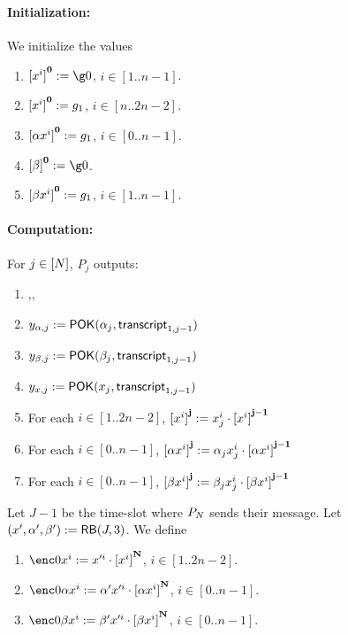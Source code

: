 \documentclass{article}
\begin{document}
\paragraph{Initialization:}
We initialize the values
\begin{enumerate}
 \item $\acc{x^i}{0}\defeq \g0$, $i\in [1..n-1]$. 
 \item ${{[x^i]}^{\mathbf{0}}}:= g_1$, $i\in [n..2n-2]$. 
 \item ${{[\alpha x^i]}^{\mathbf{0}}}:= g_1$, $i\in [0..n-1]$.
 \item $\acc{\beta}{0}\defeq \g0$.
 \item ${{[\beta x^i]}^{\mathbf{0}}}:= g_1$, $i\in [1..n-1]$.
\end{enumerate}


\paragraph{Computation:}
For $j\in[N]$, $P_j$ outputs:
\begin{enumerate}
 \item {},,


 \item$ y_{\alpha,j}:= \mathsf{POK}(\alpha_j,\mathsf{transcript}_{1,j-1})$
 \item $y_{\beta,j}:= \mathsf{POK}(\beta_j,\mathsf{transcript}_{1,j-1})$
\item  $y_{x,j}:= \mathsf{POK}(x_j,\mathsf{transcript}_{1,j-1})$ 
 \item For each $i\in [1..2n-2]$, ${{[x^i]}^{\mathbf{j}}}:= x_j^i\cdot {\ensuremath{{[x^i]}^{\mathbf{j-1}}}}$
 \item For each $i\in [0..n-1]$, ${{[\alpha x^i]}^{\mathbf{j}}}:= \alpha_j x_j^i\cdot {\ensuremath{{[\alpha x^i]}^{\mathbf{j-1}}}}$
 \item For each $i\in [0..n-1]$, ${{[\beta x^i]}^{\mathbf{j}}}:= \beta_j x_j^i\cdot {\ensuremath{{[\beta x^i]}^{\mathbf{j-1}}}}$
 
\end{enumerate}
Let $J-1$ be the time-slot where $P_N$ sends their message.
Let $(x',\alpha',\beta'):= \mathsf{\mathsf {RB}}(J,3)$.
We define
\begin{enumerate}
 \item $\enc0{x^i}\defeq x'^i\cdot \acc{x^i}{\numplayers}$, $i\in[1..2n-2]$.
 \item $\enc0{\alpha x^i}\defeq \alpha' x'^i\cdot \acc{\alpha x^i}{\numplayers}$, $i\in [0..n-1]$.
 \item $\enc0{\beta x^i}\defeq \beta' x'^i \cdot \acc{\beta x^i}{\numplayers}$, $i\in[0..n-1]$.

\end{enumerate}
\end{document}
